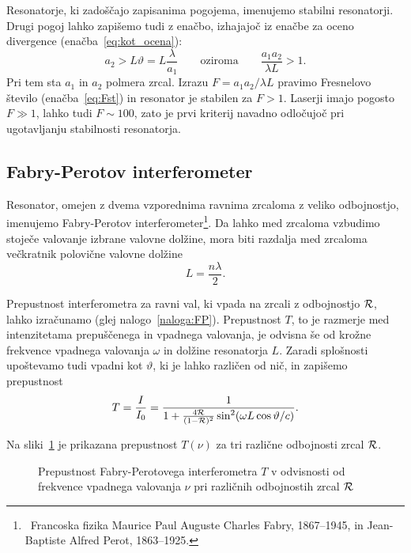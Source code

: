Resonatorje, ki zadoščajo zapisanima pogojema, imenujemo stabilni 
resonatorji.
Drugi pogoj lahko zapišemo tudi z enačbo, izhajajoč iz enačbe za oceno divergence (enačba~\ref{eq:kot_ocena}):
\begin{equation}
a_2 > L \vartheta = L\frac{\lambda}{a_1}\qquad \mathrm{oziroma} \qquad
\frac{a_{1}a_{2}}{\lambda L}>1.
\label{eq:Fresnelovo_stevilo}
\end{equation}
Pri tem sta $a_{1}$ in $a_{2}$ polmera zrcal. Izrazu 
$
F = a_{1}a_{2}/\lambda L
$
pravimo Fresnelovo število (enačba~\ref{eq:Fst})
in resonator je stabilen za $F>1$. Laserji imajo pogosto $F\gg 1$, lahko tudi $F \sim 100$, zato je 
prvi kriterij navadno odločujoč pri ugotavljanju stabilnosti resonatorja.

\subsection*{Fabry-Perotov interferometer}
Resonator, omejen z dvema vzporednima ravnima zrcaloma
z veliko odbojnostjo, imenujemo Fabry-Perotov 
interferometer\footnote{~Francoska fizika Maurice Paul Auguste Charles Fabry, 1867--1945, in 
Jean-Baptiste Alfred Perot, 1863--1925.}. 
Da lahko med zrcaloma vzbudimo stoječe valovanje izbrane valovne dolžine, mora biti razdalja 
med zrcaloma večkratnik polovične valovne dolžine
\begin{equation}
L = \frac{n \lambda}{2}.
\end{equation}

Prepustnost interferometra za ravni val, ki vpada na zrcali z
odbojnostjo ${\cal R}$, lahko izračunamo (glej nalogo~\ref{naloga:FP}). Prepustnost $T$, to je 
razmerje med intenzitetama prepuščenega in vpadnega valovanja, je odvisna še
od krožne frekvence vpadnega valovanja $\omega$ in dolžine resonatorja $L$. Zaradi splošnosti upoštevamo
tudi vpadni kot $\vartheta$, ki je lahko različen od nič, in zapišemo prepustnost
\begin{equation}
T=\frac{I}{I_0} = \frac{1}{1+\frac{4{\cal R}}{(1-{\cal R})^{2}}\sin^{2}(\omega L \cos \vartheta /c)}.
\label{eq:Fabry-Perot-prepustnost}
\end{equation}

Na sliki~\ref{fig:Fabry-Perot} je prikazana prepustnost $T(\nu)$ za tri različne 
odbojnosti zrcal ${\cal R}$.
\begin{figure}[ht]
\centering
\def\svgwidth{100truemm} 

\caption{
Prepustnost Fabry-Perotovega interferometra $T$
v odvisnosti od frekvence vpadnega valovanja $\nu$ pri različnih odbojnostih zrcal ${\cal R}$}
\label{fig:Fabry-Perot}
\end{figure}

